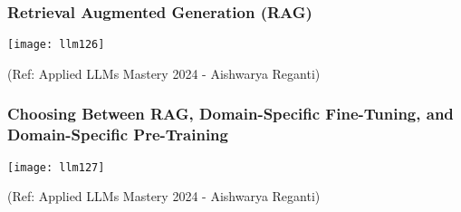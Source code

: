 \begin{frame}[fragile]\frametitle{Retrieval Augmented Generation (RAG)}

\begin{center}
\texttt{[image: llm126]}
\end{center}				

{\tiny (Ref: Applied LLMs Mastery 2024 - Aishwarya Reganti)}

\end{frame}

\begin{frame}[fragile]\frametitle{Choosing Between RAG, Domain-Specific Fine-Tuning, and Domain-Specific Pre-Training}

\begin{center}
\texttt{[image: llm127]}
\end{center}				

{\tiny (Ref: Applied LLMs Mastery 2024 - Aishwarya Reganti)}

\end{frame}

